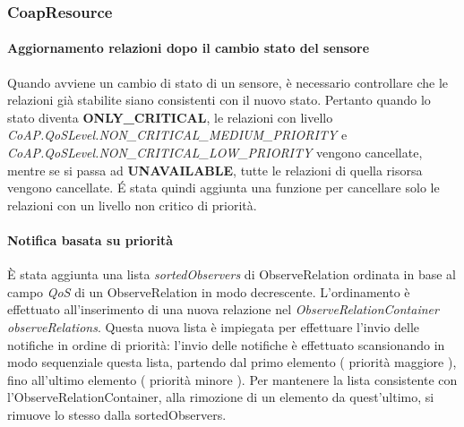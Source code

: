 			\subsubsection{CoapResource}
				\paragraph{Aggiornamento relazioni dopo il cambio stato del sensore}
				Quando avviene un cambio di stato di un sensore, è necessario controllare che le relazioni già stabilite siano consistenti con il nuovo stato. Pertanto quando lo stato diventa \textbf{ONLY\_CRITICAL}, le relazioni con livello \textit{CoAP.QoSLevel.NON\_CRITICAL\_MEDIUM\_PRIORITY} e \textit{CoAP.QoSLevel.NON\_CRITICAL\_LOW\_PRIORITY} vengono cancellate, mentre se si passa ad \textbf{UNAVAILABLE}, tutte le relazioni di quella risorsa vengono cancellate. \'E stata quindi aggiunta una funzione per cancellare solo le relazioni con un livello non critico di priorità. \newline
				
				\paragraph{Notifica basata su priorità}
				È stata aggiunta una lista \textit{sortedObservers} di ObserveRelation ordinata in base al campo \textit{QoS} di un ObserveRelation in modo decrescente. L’ordinamento è effettuato all’inserimento di una nuova relazione nel \textit{ObserveRelationContainer observeRelations}. Questa nuova lista è impiegata per effettuare l’invio delle notifiche in ordine di priorità: l'invio delle notifiche è effettuato scansionando in modo sequenziale questa lista, partendo dal primo elemento ( priorità maggiore ), fino all'ultimo elemento ( priorità minore ). Per mantenere la lista consistente con l’ObserveRelationContainer, alla rimozione di un elemento da quest’ultimo, si rimuove lo stesso dalla sortedObservers.\newline
				
				
				
				
